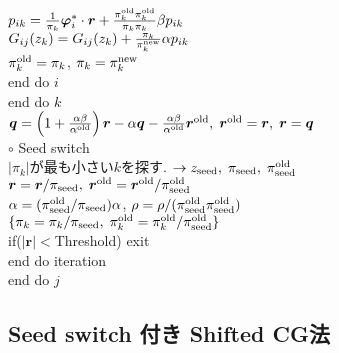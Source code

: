 \documentclass[12pt,titlepage]{jarticle}
\begin{document}
$p_{i k} = \frac{1}{\pi_k} {\boldsymbol \varphi}_i^* \cdot {\boldsymbol r} + 
\frac{\pi^{\rm old}_k \pi^{\rm old}_k}{\pi_k \pi_k} \beta p_{i k}$
\\\hspace{2.0cm}
$G_{i j}(z_k) = G_{i j}(z_k) + \frac{\pi_k}{\pi_k^{\rm new}} \alpha p_{i k}$
\\\hspace{2.0cm}
$\pi_k^{\rm old} = \pi_k$, $\pi_k = \pi_k^{\rm new}$
\\\hspace{1.5cm}
end do $i$
\\\hspace{1.0cm}
end do $k$
\\\hspace{1.0cm}
${\boldsymbol q} = \left( 1 + \frac{\alpha \beta}{\alpha^{\rm old}} \right) {\boldsymbol r}
- \alpha {\boldsymbol q} - \frac{\alpha \beta}{\alpha^{\rm old}} {\boldsymbol r}^{\rm old},\; 
{\boldsymbol r}^{\rm old} = {\boldsymbol r},\; {\boldsymbol r} = {\boldsymbol q}$
\\\hspace{1.0cm}
$\circ$ Seed switch
\\\hspace{1.0cm}
$|\pi_k|$が最も小さい$k$を探す. 
$\rightarrow z_{\rm seed},\; \pi_{\rm seed},\; \pi_{\rm seed}^{\rm old} $
\\\hspace{1.0cm}
${\boldsymbol r} = {\boldsymbol r} / \pi_{\rm seed},\; 
{\boldsymbol r}^{\rm old} = {\boldsymbol r}^{\rm old} / \pi_{\rm seed}^{\rm old}$
\\\hspace{1.0cm}
$\alpha = (\pi_{\rm seed}^{\rm old} / \pi_{\rm seed}) \alpha$,
$\rho = \rho / (\pi_{\rm seed}^{\rm old} \pi_{\rm seed}^{\rm old})$
\\\hspace{1.0cm}
$\{\pi_k = \pi_k/\pi_{\rm seed},\; \pi_k^{\rm old} = \pi_k^{\rm old} / \pi_{\rm seed}^{\rm old}\}$
\\\hspace{1.0cm}
if($|{\boldsymbol r}| < $Threshold) exit
\\\hspace{0.5cm}
end do iteration
\\
end do $j$

\subsection{Seed switch 付き Shifted CG法}
\end{document}
